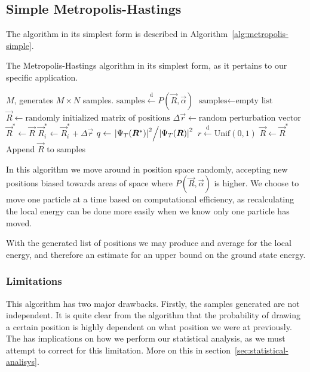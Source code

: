 \documentclass[twocolumn]{article}
\newcommand{\setfrom}{\overset{\mathrm{d}}{\leftarrow}}
\begin{document}
\subsection{Simple Metropolis-Hastings}
The algorithm in its
simplest form is described in Algorithm~\ref{alg:metropolis-simple}.

\begin{algorithm}[H]
    \caption{The Metropolis-Hastings algorithm in its simplest form, as it
    pertains to our specific application.}
    \label{alg:metropolis-simple}
    \begin{algorithmic}[1]
        \REQUIRE $M$, generates $M\times N$ samples.
        \ENSURE $\text{samples} \setfrom P(\vec R, \vec\alpha)$
        \STATE $\text{samples} \leftarrow \text{empty list}$
        \STATE $\vec R \leftarrow \text{randomly initialized matrix of positions}$
                \STATE $\Delta \vec{r} \leftarrow \text{random perturbation vector}$
                \STATE $\vec R^*\leftarrow \vec R $
                \STATE $\vec R^*_i \leftarrow \vec R^{*}_i+ \Delta \vec{r}$ 
                \STATE $q \leftarrow \flatfrac{\abs{\Psi_T(\vec R^*)}^2}{\abs{\Psi_T(\vec R)}^2}$
                \STATE $r \setfrom \text{Unif}(0, 1)$
                    \STATE $\vec R \leftarrow \vec R^*$
                \ENDIF
                \STATE Append $\vec R$ to samples
            \ENDFOR
        \ENDFOR
    \end{algorithmic}
\end{algorithm}

In this algorithm we move around in position space randomly, accepting new
positions biased towards areas of space where $P(\vec R,\vec\alpha)$ is higher.
We choose to move one particle at a time based on computational efficiency, as
recalculating the local energy can be done more easily when we know only one
particle has moved.

With the generated list of positions we may produce and average for the local
energy, and therefore an estimate for an upper bound on the ground state energy. 

\subsubsection{Limitations}
This algorithm has two major drawbacks. Firstly, the samples generated are not
independent. It is quite clear from the algorithm that the probability of
drawing a certain position is highly dependent on what position we were at
previously. The has implications on how we perform our statistical analysis, as
we must attempt to correct for this limitation. More on this in
section~\ref{sec:statistical-analisys}.
\end{document}
